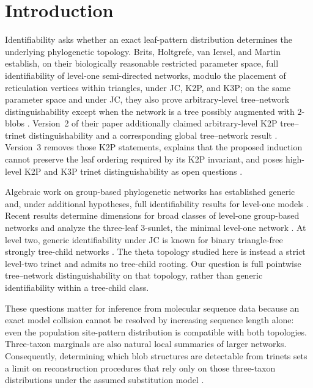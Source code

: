 \documentclass[11pt]{article}
\theoremstyle{remark}\newtheorem{remark}[theorem]{Remark}
\begin{document}
\section{Introduction}
Identifiability asks whether an exact leaf-pattern distribution determines the underlying phylogenetic topology. Brits, Holtgrefe, van Iersel, and Martin establish, on their biologically reasonable restricted parameter space, full identifiability of level-one semi-directed networks, modulo the placement of reticulation vertices within triangles, under JC, K2P, and K3P; on the same parameter space and under JC, they also prove arbitrary-level tree--network distinguishability except when the network is a tree possibly augmented with $2$-blobs \cite{BritsEtAl2026v3}. Version~2 of their paper additionally claimed arbitrary-level K2P tree--trinet distinguishability and a corresponding global tree--network result \cite{BritsEtAl2026v2}. Version~3 removes those K2P statements, explains that the proposed induction cannot preserve the leaf ordering required by its K2P invariant, and poses high-level K2P and K3P trinet distinguishability as open questions \cite{BritsEtAl2026v3}.

Algebraic work on group-based phylogenetic networks has established generic and, under additional hypotheses, full identifiability results for level-one models \cite{GrossLong2018,GrossEtAl2021}. Recent results determine dimensions for broad classes of level-one group-based networks and analyze the three-leaf 3-sunlet, the minimal level-one network \cite{GrossKroneMartin2024,CoxGrossMartin2025}. At level two, generic identifiability under JC is known for binary triangle-free strongly tree-child networks \cite{EnglanderEtAl2025}. The theta topology studied here is instead a strict level-two trinet and admits no tree-child rooting. Our question is full pointwise tree--network distinguishability on that topology, rather than generic identifiability within a tree-child class.

These questions matter for inference from molecular sequence data because an exact model collision cannot be resolved by increasing sequence length alone: even the population site-pattern distribution is compatible with both topologies. Three-taxon marginals are also natural local summaries of larger networks. Consequently, determining which blob structures are detectable from trinets sets a limit on reconstruction procedures that rely only on those three-taxon distributions under the assumed substitution model \cite{GrossLong2018}.
\end{document}

